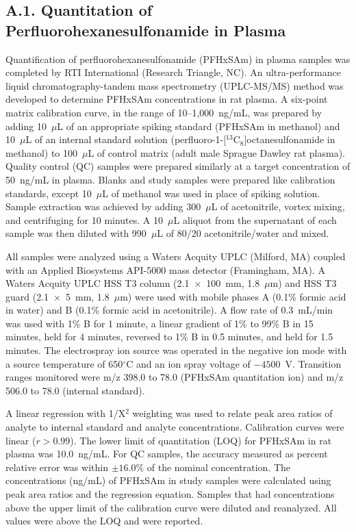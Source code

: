 \subsection*{A.1. Quantitation of Perfluorohexanesulfonamide in Plasma}

Quantification of perfluorohexanesulfonamide (PFHxSAm) in plasma samples was completed by RTI International (Research Triangle, NC). An ultra-performance liquid chromatography-tandem mass spectrometry (UPLC-MS/MS) method was developed to determine PFHxSAm concentrations in rat plasma. A six-point matrix calibration curve, in the range of 10--1,000~ng/mL, was prepared by adding 10~$\mu$L of an appropriate spiking standard (PFHxSAm in methanol) and 10~$\mu$L of an internal standard solution (perfluoro-1-[$^{13}$C$_{8}$]octanesulfonamide in methanol) to 100~$\mu$L of control matrix (adult male Sprague Dawley rat plasma). Quality control (QC) samples were prepared similarly at a target concentration of 50~ng/mL in plasma. Blanks and study samples were prepared like calibration standards, except 10~$\mu$L of methanol was used in place of spiking solution. Sample extraction was achieved by adding 300~$\mu$L of acetonitrile, vortex mixing, and centrifuging for 10 minutes. A 10~$\mu$L aliquot from the supernatant of each sample was then diluted with 990~$\mu$L of 80/20 acetonitrile/water and mixed.

All samples were analyzed using a Waters Acquity UPLC (Milford, MA) coupled with an Applied Biosystems API-5000 mass detector (Framingham, MA). A Waters Acquity UPLC HSS T3 column (2.1~$\times$~100~mm, 1.8~$\mu$m) and HSS T3 guard (2.1~$\times$~5~mm, 1.8~$\mu$m) were used with mobile phases A (0.1\% formic acid in water) and B (0.1\% formic acid in acetonitrile). A flow rate of 0.3~mL/min was used with 1\% B for 1 minute, a linear gradient of 1\% to 99\% B in 15 minutes, held for 4 minutes, reversed to 1\% B in 0.5 minutes, and held for 1.5 minutes. The electrospray ion source was operated in the negative ion mode with a source temperature of 650$^{\circ}$C and an ion spray voltage of $-4500$~V. Transition ranges monitored were m/z 398.0 to 78.0 (PFHxSAm quantitation ion) and m/z 506.0 to 78.0 (internal standard).

A linear regression with 1/X$^{2}$ weighting was used to relate peak area ratios of analyte to internal standard and analyte concentrations. Calibration curves were linear ($r > 0.99$). The lower limit of quantitation (LOQ) for PFHxSAm in rat plasma was 10.0~ng/mL. For QC samples, the accuracy measured as percent relative error was within $\pm16.0\%$ of the nominal concentration. The concentrations (ng/mL) of PFHxSAm in study samples were calculated using peak area ratios and the regression equation. Samples that had concentrations above the upper limit of the calibration curve were diluted and reanalyzed. All values were above the LOQ and were reported.
